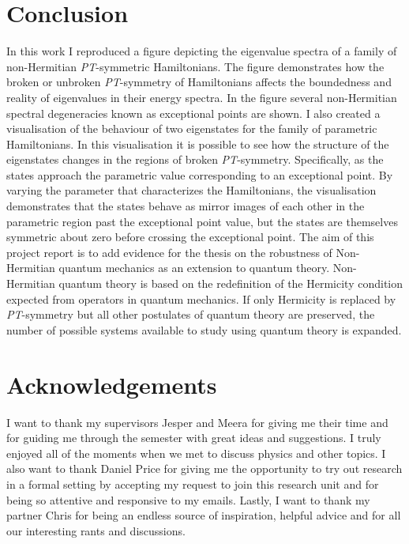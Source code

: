 \documentclass[10pt, a4paper, singlespacing, headsepline]{report}
\newcommand\PT{\emph{PT}}
\begin{document}
\chapter{Conclusion}\label{Conclusion}
 In this work I reproduced a figure depicting the eigenvalue spectra of a family of non-Hermitian \PT-symmetric Hamiltonians. The figure demonstrates how the broken or unbroken \PT-symmetry of Hamiltonians affects the boundedness and reality of eigenvalues in their energy spectra. In the figure several non-Hermitian spectral degeneracies known as exceptional points are shown. I also created a visualisation of the behaviour of two eigenstates for the family of parametric Hamiltonians. In this visualisation it is possible to see how the structure of the eigenstates changes in the regions of broken \PT-symmetry. Specifically, as the states approach the parametric value corresponding to an exceptional point. By varying the parameter that characterizes the Hamiltonians, the visualisation demonstrates that the states behave as mirror images of each other in the parametric region past the exceptional point value, but the states are themselves symmetric about zero before crossing the exceptional point. The aim of this project report is to add evidence for the thesis on the robustness of Non-Hermitian quantum mechanics as an extension to quantum theory. Non-Hermitian quantum theory is based on the redefinition of the Hermicity condition expected from operators in quantum mechanics. If only Hermicity is replaced by \PT-symmetry but all other postulates of quantum theory are preserved, the number of possible systems available to study using quantum theory is expanded.

\chapter{Acknowledgements}\label{Acknowledgements}
I want to thank my supervisors Jesper and Meera for giving me their time and for guiding me through the semester with great ideas and suggestions. I truly enjoyed all of the moments when we met to discuss physics and other topics. I also want to thank Daniel Price for giving me the opportunity to try out research in a formal setting by accepting my request to join this research unit and for being so attentive and responsive to my emails. Lastly, I want to thank my partner Chris for being an endless source of inspiration, helpful advice and for all our interesting rants and discussions. 
\end{document}

